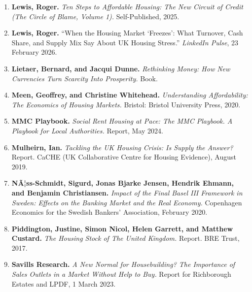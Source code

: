 \begin{enumerate}
{{  Roger.} ``Housing Credit, Broad Money, and the Real Economy: A UK View
  (or, When `Macroprudence' Becomes a Housing Scheme).'' \emph{LinkedIn
  Pulse}, 23 February 2026.}
\item
  \protect{}\label{ref-lewis-tensteps}{\textbf{Lewis,
  Roger.} \emph{Ten Steps to Affordable Housing: The New Circuit of
  Credit (The Circle of Blame, Volume 1).} Self-Published, 2025.}
\item
  \protect{}\label{ref-lewis-linkedin-freeze}{\textbf{Lewis,
  Roger.} ``When the Housing Market `Freezes': What Turnover, Cash
  Share, and Supply Mix Say About UK Housing Stress.'' \emph{LinkedIn
  Pulse}, 23 February 2026.}
\item
  \protect{}\label{ref-lietaer}{\textbf{Lietaer, Bernard,
  and Jacqui Dunne.} \emph{Rethinking Money: How New Currencies Turn
  Scarcity Into Prosperity.} Book.}
\item
  \protect{}\label{ref-meen2020}{\textbf{Meen, Geoffrey,
  and Christine Whitehead.} \emph{Understanding Affordability: The
  Economics of Housing Markets.} Bristol: Bristol University Press,
  2020.}
\item
  \protect{}\label{ref-mmcplaybook2024}{\textbf{MMC
  Playbook.} \emph{Social Rent Housing at Pace: The MMC Playbook. A
  Playbook for Local Authorities.} Report, May 2024.}
\item
  \protect{}\label{ref-mulheirn2019}{\textbf{Mulheirn,
  Ian.} \emph{Tackling the UK Housing Crisis: Is Supply the Answer?}
  Report. CaCHE (UK Collaborative Centre for Housing Evidence), August
  2019.}
\item
  \protect{}\label{ref-naess2020}{\textbf{NÃ¦ss-Schmidt,
  Sigurd, Jonas Bjarke Jensen, Hendrik Ehmann, and Benjamin
  Christiansen.} \emph{Impact of the Final Basel III Framework in
  Sweden: Effects on the Banking Market and the Real Economy.}
  Copenhagen Economics for the Swedish Bankers' Association, February
  2020.}
\item
  \protect{}\label{ref-piddington2017}{\textbf{Piddington,
  Justine, Simon Nicol, Helen Garrett, and Matthew Custard.} \emph{The
  Housing Stock of The United Kingdom.} Report. BRE Trust, 2017.}
\item
  \protect{}\label{ref-savills2023}{\textbf{Savills
  Research.} \emph{A New Normal for Housebuilding? The Importance of
  Sales Outlets in a Market Without Help to Buy.} Report for Richborough
  Estates and LPDF, 1 March 2023.}

\end{enumerate}
